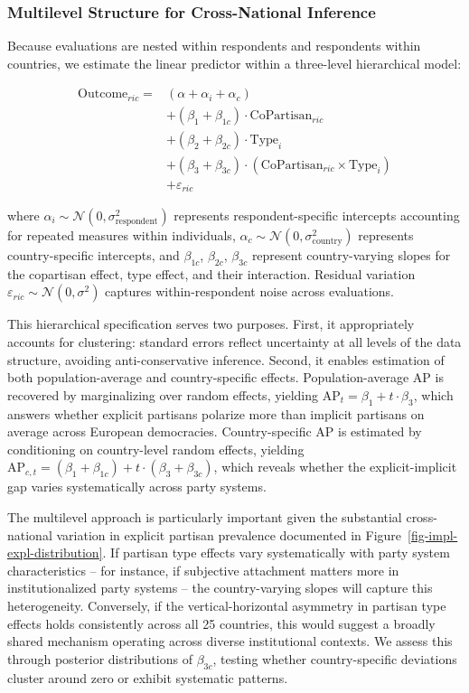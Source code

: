 \documentclass[
  12pt,
  a4paper,
  DIV=11,
  numbers=noendperiod]{scrartcl}
\begin{document}
\subsubsection{Multilevel Structure for Cross-National
Inference}\label{sec-multilevel-structure}

Because evaluations are nested within respondents and respondents within
countries, we estimate the linear predictor within a three-level
hierarchical model:

\[
\begin{aligned}
\text{Outcome}_{ric} = &(\alpha + \alpha_i + \alpha_c) \\
&+ (\beta_1 + \beta_{1c}) \cdot \text{CoPartisan}_{ric} \\
&+ (\beta_2 + \beta_{2c}) \cdot \text{Type}_i \\
&+ (\beta_3 + \beta_{3c}) \cdot (\text{CoPartisan}_{ric} \times \text{Type}_i) \\
&+ \varepsilon_{ric}
\end{aligned}
\]

where \(\alpha_i \sim \mathcal{N}(0, \sigma_{\text{respondent}}^2)\)
represents respondent-specific intercepts accounting for repeated
measures within individuals,
\(\alpha_c \sim \mathcal{N}(0, \sigma_{\text{country}}^2)\) represents
country-specific intercepts, and \(\beta_{1c}\), \(\beta_{2c}\),
\(\beta_{3c}\) represent country-varying slopes for the copartisan
effect, type effect, and their interaction. Residual variation
\(\varepsilon_{ric} \sim \mathcal{N}(0, \sigma^2)\) captures
within-respondent noise across evaluations.

This hierarchical specification serves two purposes. First, it
appropriately accounts for clustering: standard errors reflect
uncertainty at all levels of the data structure, avoiding
anti-conservative inference. Second, it enables estimation of both
population-average and country-specific effects. Population-average AP
is recovered by marginalizing over random effects, yielding
\(\text{AP}_t = \beta_1 + t \cdot \beta_3\), which answers whether
explicit partisans polarize more than implicit partisans on average
across European democracies. Country-specific AP is estimated by
conditioning on country-level random effects, yielding
\(\text{AP}_{c,t} = (\beta_1 + \beta_{1c}) + t \cdot (\beta_3 + \beta_{3c})\),
which reveals whether the explicit-implicit gap varies systematically
across party systems.

The multilevel approach is particularly important given the substantial
cross-national variation in explicit partisan prevalence documented in
Figure~\ref{fig-impl-expl-distribution}. If partisan type effects vary
systematically with party system characteristics -- for instance, if
subjective attachment matters more in institutionalized party systems --
the country-varying slopes will capture this heterogeneity. Conversely,
if the vertical-horizontal asymmetry in partisan type effects holds
consistently across all 25 countries, this would suggest a broadly
shared mechanism operating across diverse institutional contexts. We
assess this through posterior distributions of \(\beta_{3c}\), testing
whether country-specific deviations cluster around zero or exhibit
systematic patterns.
\end{document}

